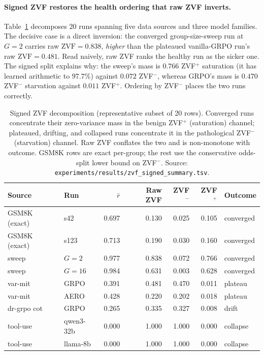 \documentclass{article}
\begin{document}
\paragraph{Signed ZVF restores the health ordering that raw ZVF inverts.}
Table~\ref{tab:zvf-signed} decomposes 20 runs spanning five data sources
and three model families. The decisive case is a direct inversion: the
converged group-size-sweep run at $G{=}2$ carries raw
$\mathrm{ZVF}{=}0.838$, \emph{higher} than the plateaued vanilla-GRPO
run's raw $\mathrm{ZVF}{=}0.481$. Read naively, raw ZVF ranks the healthy
run as the sicker one. The signed split explains why: the sweep's mass is
$0.766$ ZVF$^+$ saturation (it has learned arithmetic to $97.7\%$) against
$0.072$ ZVF$^-$, whereas GRPO's mass is $0.470$ ZVF$^-$ starvation against
$0.011$ ZVF$^+$. Ordering by ZVF$^-$ places the two runs correctly.

\begin{table}[htbp]
\centering
\small
\setlength{\tabcolsep}{4pt}
\begin{tabular}{llrrrrl}
\hline
Source & Run & $\bar r$ & Raw ZVF & ZVF$^-$ & ZVF$^+$ & Outcome \\
\hline
GSM8K (exact)   & s42      & 0.697 & 0.130 & 0.025 & 0.105 & converged \\
GSM8K (exact)   & s123     & 0.713 & 0.190 & 0.030 & 0.160 & converged \\
sweep           & $G{=}2$  & 0.977 & 0.838 & 0.072 & 0.766 & converged \\
sweep           & $G{=}16$ & 0.984 & 0.631 & 0.003 & 0.628 & converged \\
var-mit         & GRPO     & 0.391 & 0.481 & 0.470 & 0.011 & plateau \\
var-mit         & AERO     & 0.428 & 0.220 & 0.202 & 0.018 & plateau \\
dr-grpo cot     & GRPO     & 0.265 & 0.335 & 0.327 & 0.008 & drift \\
tool-use        & qwen3-32b& 0.000 & 1.000 & 1.000 & 0.000 & collapse \\
tool-use        & llama-8b & 0.000 & 1.000 & 1.000 & 0.000 & collapse \\
\hline
\end{tabular}
\caption{Signed ZVF decomposition (representative subset of 20 rows).
Converged runs concentrate their zero-variance mass in the benign
ZVF$^+$ (saturation) channel; plateaued, drifting, and collapsed runs
concentrate it in the pathological ZVF$^-$ (starvation) channel. Raw ZVF
conflates the two and is non-monotone with outcome. GSM8K rows are exact
per-group; the rest use the conservative odds-split lower bound on
ZVF$^-$. Source:
\texttt{experiments/results/zvf\_signed\_summary.tsv}.}
\label{tab:zvf-signed}
\end{table}
\end{document}
